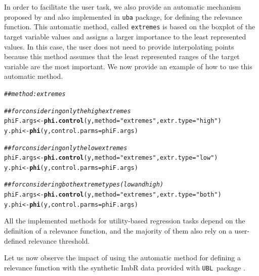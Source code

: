 \documentclass[10pt,a4paper]{article}\usepackage[]{graphicx}\usepackage[]{color}
\makeatletter
\newcommand{\hlstr}[1]{\textcolor[rgb]{0.192,0.494,0.8}{#1}}%
\newcommand{\hlcom}[1]{\textcolor[rgb]{0.678,0.584,0.686}{\textit{#1}}}%
\newcommand{\hlstd}[1]{\textcolor[rgb]{0.345,0.345,0.345}{#1}}%
\newcommand{\hlkwb}[1]{\textcolor[rgb]{0.69,0.353,0.396}{#1}}%
\newcommand{\hlkwc}[1]{\textcolor[rgb]{0.333,0.667,0.333}{#1}}%
\newcommand{\hlkwd}[1]{\textcolor[rgb]{0.737,0.353,0.396}{\textbf{#1}}}%
\newenvironment{kframe}{%
 \def\at@end@of@kframe{}%
 \ifinner\ifhmode%
  \def\at@end@of@kframe{\end{minipage}}%
  \begin{minipage}{\columnwidth}%
 \fi\fi%
 \def\FrameCommand##1{\hskip\@totalleftmargin \hskip-\fboxsep
 \colorbox{shadecolor}{##1}\hskip-\fboxsep
     \hskip-\linewidth \hskip-\@totalleftmargin \hskip\columnwidth}%
 \MakeFramed {\advance\hsize-\width
   \@totalleftmargin\z@ \linewidth\hsize
   \@setminipage}}%
 {\par\unskip\endMakeFramed%
 \at@end@of@kframe}
\newenvironment{knitrout}{}{} %
\newcommand{\UBLp}{\texttt{UBL}\ package  }
\makeatother
\begin{document}
In order to facilitate the user task, we also provide an automatic mechanism proposed by \cite{ribeiro2011utility} and also implemented in \texttt{uba} package, for defining the relevance function. This automatic method, called \texttt{extremes} is based on the boxplot of the target variable values and assigns a larger importance to the least represented values. In this case, the user does not need to provide interpolating points because this method assumes that the least represented ranges of the target variable are the most important. We now provide an example of how to use this automatic method.

\begin{knitrout}\footnotesize
{}\color{fgcolor}\begin{kframe}
\begin{alltt}
\hlcom{## method: extremes}

\hlcom{## for considering only the high extremes}
\hlstd{phiF.args} \hlkwb{<-} \hlkwd{phi.control}\hlstd{(y,}\hlkwc{method} \hlstd{=} \hlstr{"extremes"}\hlstd{,}\hlkwc{extr.type} \hlstd{=} \hlstr{"high"}\hlstd{)}
\hlstd{y.phi} \hlkwb{<-} \hlkwd{phi}\hlstd{(y,}\hlkwc{control.parms} \hlstd{= phiF.args)}

\hlcom{## for considering only the low extremes}
\hlstd{phiF.args} \hlkwb{<-} \hlkwd{phi.control}\hlstd{(y,}\hlkwc{method} \hlstd{=} \hlstr{"extremes"}\hlstd{,}\hlkwc{extr.type} \hlstd{=} \hlstr{"low"}\hlstd{)}
\hlstd{y.phi} \hlkwb{<-} \hlkwd{phi}\hlstd{(y,}\hlkwc{control.parms} \hlstd{= phiF.args)}

\hlcom{## for considering both extreme types (low and high)}
\hlstd{phiF.args} \hlkwb{<-} \hlkwd{phi.control}\hlstd{(y,}\hlkwc{method} \hlstd{=} \hlstr{"extremes"}\hlstd{,}\hlkwc{extr.type} \hlstd{=} \hlstr{"both"}\hlstd{)}
\hlstd{y.phi} \hlkwb{<-} \hlkwd{phi}\hlstd{(y,}\hlkwc{control.parms} \hlstd{= phiF.args)}
\end{alltt}
\end{kframe}
\end{knitrout}

All the implemented methods for utility-based regression tasks depend on the definition of a relevance function, and the majority of them also rely on a user-defined relevance threshold.


Let us now observe the impact of using the automatic method for defining a relevance function with the synthetic ImbR data provided with \UBLp.
\end{document}
